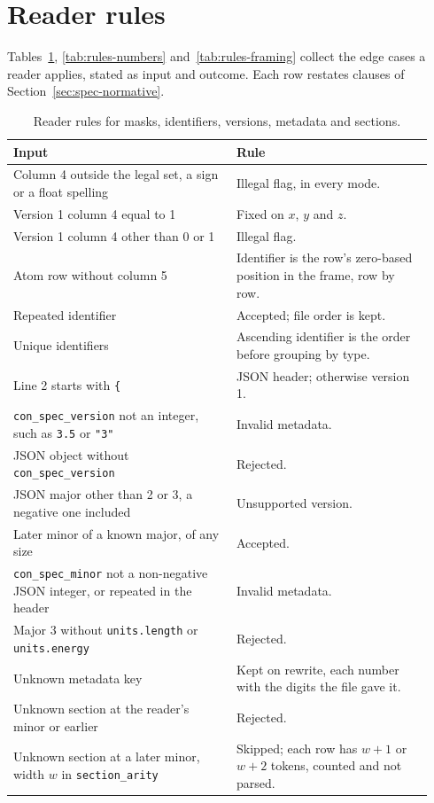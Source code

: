 \documentclass[preprint,12pt]{elsarticle}
\begin{document}
\FloatBarrier \section{Reader rules}\label{sec:appendix-rules} Tables~\ref{tab:rules}, \ref{tab:rules-numbers} and~\ref{tab:rules-framing} collect the edge cases a reader applies, stated as input and outcome.
Each row restates clauses of Section~\ref{sec:spec-normative}.

\begin{table}[tbp] \centering \small \caption{Reader rules for masks, identifiers, versions, metadata and sections.}
\label{tab:rules}
\begin{tabular}{@{}p{0.50\linewidth}p{0.44\linewidth}@{}}
\toprule
Input & Rule \\
\midrule
Column 4 outside the legal set, a sign or a float spelling & Illegal flag, in every mode. \\
Version 1 column 4 equal to 1 & Fixed on \(x\), \(y\) and \(z\). \\
Version 1 column 4 other than 0 or 1 & Illegal flag. \\
Atom row without column 5 & Identifier is the row's zero-based position in the frame, row by row. \\
Repeated identifier & Accepted; file order is kept. \\
Unique identifiers & Ascending identifier is the order before grouping by type. \\
Line 2 starts with \texttt{\{} & JSON header; otherwise version 1. \\
\texttt{con\_spec\_version} not an integer, such as \texttt{3.5} or \texttt{"3"} & Invalid metadata. \\
JSON object without \texttt{con\_spec\_version} & Rejected. \\
JSON major other than 2 or 3, a negative one included & Unsupported version. \\
Later minor of a known major, of any size & Accepted. \\
\texttt{con\_spec\_minor} not a non-negative JSON integer, or repeated in the header & Invalid metadata. \\
Major 3 without \texttt{units.length} or \texttt{units.energy} & Rejected. \\
Unknown metadata key & Kept on rewrite, each number with the digits the file gave it. \\
Unknown section at the reader's minor or earlier & Rejected. \\
Unknown section at a later minor, width \(w\) in \texttt{section\_arity} & Skipped; each row has \(w+1\) or \(w+2\) tokens, counted and not parsed. \\

\end{tabular}
\end{table}
\end{document}
